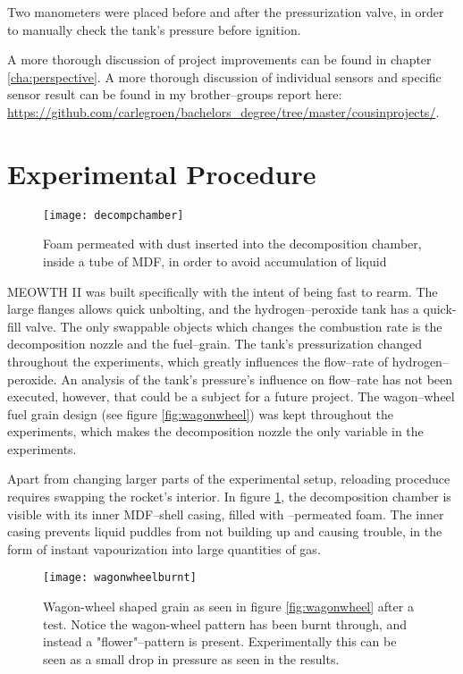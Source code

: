 	Two manometers were placed before and after the pressurization valve, in order to manually check the tank's pressure before ignition.

	A more thorough discussion of project improvements can be found in chapter \ref{cha:perspective}. A more thorough discussion of individual sensors and specific sensor result can be found in my brother--groups report here: \url{https://github.com/carlegroen/bachelors_degree/tree/master/cousinprojects/}.

	\section{Experimental Procedure}

	\begin{figure}
		\centering
		\texttt{[image: decompchamber]}
		\caption{Foam permeated with  dust inserted into the decomposition chamber, inside a tube of MDF, in order to avoid accumulation of liquid }
		\label{fig:kmno4foam2}
	\end{figure}

	MEOWTH II was built specifically with the intent of being fast to rearm. The large flanges allows quick unbolting, and the hydrogen--peroxide tank has a quick-fill valve. The only swappable objects which changes the combustion rate is the decomposition nozzle and the fuel--grain. The tank's pressurization changed throughout the experiments, which greatly influences the flow--rate of hydrogen--peroxide. An analysis of the tank's pressure's influence on flow--rate has not been executed, however, that could be a subject for a future project. The wagon--wheel fuel grain design (see figure \ref{fig:wagonwheel}) was kept throughout the experiments, which makes the decomposition nozzle the only variable in the experiments.

	Apart from changing larger parts of the experimental setup, reloading proceduce requires swapping the rocket's interior. In figure \ref{fig:kmno4foam2}, the decomposition chamber is visible with its inner MDF--shell casing, filled with --permeated foam. The inner casing prevents liquid puddles from not building up and causing trouble, in the form of instant vapourization into large quantities of gas.

	\begin{figure}
		\centering
		\texttt{[image: wagonwheelburnt]}
		\caption{Wagon-wheel shaped grain as seen in figure \ref{fig:wagonwheel} after a test. Notice the wagon-wheel pattern has been burnt through, and instead a "flower"--pattern is present. Experimentally this can be seen as a small drop in pressure as seen in the results.}
		\label{fig:burntgrain}
	\end{figure}

